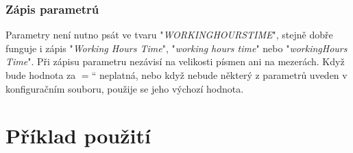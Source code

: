 \documentclass[11pt,a4paper,titlepage]{article}
\newcommand{\ceskeuvozovky}[1]{\quotedblbase#1\textquotedblleft}
\begin{document}
\subsubsection{Zápis parametrú}
Parametry není nutno psát ve tvaru "\emph{WORKINGHOURSTIME}", stejně dobře funguje i zápis "\emph{Working Hours Time}", "\emph{working hours time}" nebo "\emph{workingHours Time}". Při zápisu parametru nezávisí na velikosti písmen ani na mezerách. Když bude hodnota za \ceskeuvozovky{$=$} neplatná, nebo když nebude některý z parametrů uveden v konfiguračním souboru, použije se jeho výchozí hodnota.

\section{Příklad použití}




\newpage

\end{document}
